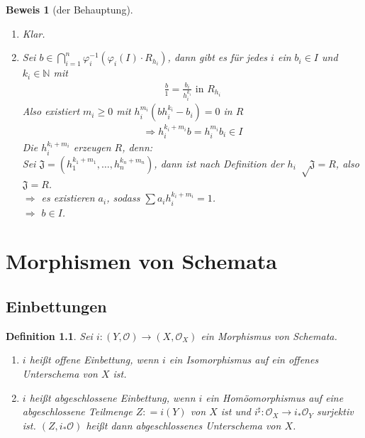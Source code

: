 \documentclass[a4paper,oneside]{scrbook}
\theoremstyle{break}
\newtheorem{Def}{Definition}[section]
\theoremstyle{nonumberbreak}
\theoremstyle{nonumberplain}
\newtheorem{Bew}{Beweis}
\theoremstyle{break}
\newcommand{\defeqr}[0]{\mathrel{\mathop:}=}
\begin{document}
\begin{Bew}[der Behauptung]
  \begin{enumerate}
  \item[``$\subseteq$''] Klar.
  \item[``$\supseteq$''] Sei $b\in\bigcap_{i=1}^n\varphi_i^{-1}(\varphi_i(I)\cdot R_{h_i})$, 
    dann gibt es für jedes $i$ ein $b_i\in I$ und $k_i\in\mathbb N$ mit
    \begin{align*}
      \frac{b}{1}=\frac{b_i}{h_i^{k_i}}\text{ in } R_{h_i}
    \end{align*}
    Also existiert $m_i\geq 0$ mit $h_i^{m_i}(bh_i^{k_i}-b_i)=0$ in $R$
    \begin{align*}
      \Rightarrow h_i^{k_i+m_i}b=h_i^{m_i}b_i\in I
    \end{align*}
    Die $h_i^{k_i+m_i}$ erzeugen $R$, denn: \\
    Sei $\mathfrak J=(h_1^{k_1+m_1},\dots,h_n^{k_n+m_n})$, dann ist nach Definition der $h_i$ $\sqrt\mathfrak J=R$, also $\mathfrak J=R$. \\
    $\Rightarrow$ es existieren $a_i$, sodass $\sum a_ih_i^{k_i+m_i}=1$. \\
    $\Rightarrow$ $b\in I$.
  \end{enumerate}
\end{Bew}

\chapter{Morphismen von Schemata}
\setcounter{section}{5}
\section{Einbettungen}
\begin{Def}
  \label{def:6.1}
  Sei $i:(Y,\mathcal O)\to(X,\mathcal O_X)$ ein Morphismus von Schemata.
  \begin{enumerate}
  \item $i$ heißt \emph{offene Einbettung}, wenn $i$ ein Isomorphismus auf ein offenes Unterschema von $X$ ist.
  \item $i$ heißt \emph{abgeschlossene Einbettung}, wenn $i$ ein Homöomorphismus auf eine abgeschlossene Teilmenge $Z\defeqr i(Y)$ von $X$ ist und
    $i^\sharp:\mathcal O_X\to i_\ast\mathcal O_Y$ surjektiv ist.
    $(Z, i_\ast\mathcal O)$ heißt dann \emph{abgeschlossenes Unterschema} von $X$.
  \end{enumerate}
\end{Def}
\end{document}
